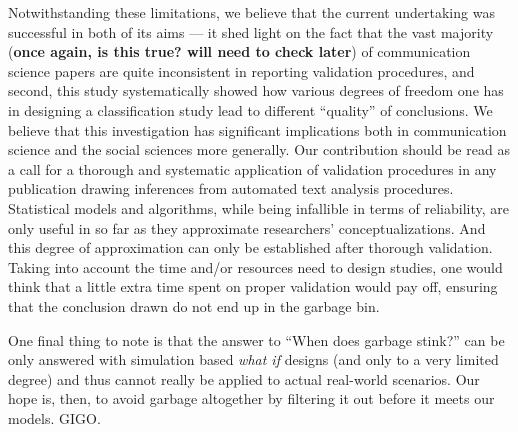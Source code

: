 \documentclass[man, 12pt, a4paper, nolmodern, noextraspace]{apa6}
\begin{document}
Notwithstanding these limitations, we believe that the current undertaking was successful in both of its aims --- it shed light on the fact that the vast majority (\textbf{once again, is this true? will need to check later}) of communication science papers are quite inconsistent in reporting validation procedures, and second, this study systematically showed how various degrees of freedom one has in designing a classification study lead to different ``quality'' of conclusions. We believe that this investigation has significant implications both in communication science and the social sciences more generally. Our contribution should be read as a call for a thorough and systematic application of validation procedures in any publication drawing inferences from automated text analysis procedures. Statistical models and algorithms, while being infallible in terms of reliability, are only useful in so far as they approximate researchers' conceptualizations. And this degree of approximation can only be established after thorough validation. Taking into account the time and/or resources need to design studies, one would think that a little extra time spent on proper validation would pay off, ensuring that the conclusion drawn do not end up in the garbage bin.

One final thing to note is that the answer to ``When does garbage stink?'' can be only answered with simulation based \textit{what if} designs (and only to a very limited degree) and thus cannot really be applied to actual real-world scenarios. Our hope is, then, to avoid garbage altogether by filtering it out before it meets our models. GIGO.
    
    
    
    
    
    
\end{document}
